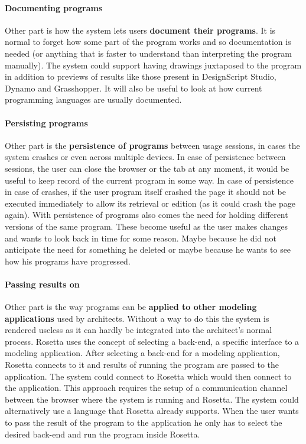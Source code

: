 \documentclass{./llncs2e/llncs}
\begin{document}
	\paragraph{Documenting programs}
	Other part is how the system lets users \textbf{document their programs}. 
	It is normal to forget how some part of the program works and so documentation is needed (or anything that is faster to understand than interpreting the program manually).
	The system could support having drawings juxtaposed to the program in addition to previews of results like those present in DesignScript Studio, Dynamo and Grasshopper. 
	It will also be useful to look at how current programming languages are usually documented. 

	\paragraph{Persisting programs}
	Other part is the \textbf{persistence of programs} between usage sessions, in cases the system crashes or even across multiple devices.
	In case of persistence between sessions, the user can close the browser or the tab at any moment, it would be useful to keep record of the current program in some way. 
	In case of persistence in case of crashes, if the user program itself crashed the page it should not be executed immediately to allow its retrieval or edition (as it could crash the page again). 
	With persistence of programs also comes the need for holding different versions of the same program. 
	These become useful as the user makes changes and wants to look back in time for some reason. 
	Maybe because he did not anticipate the need for something he deleted or maybe because he wants to see how his programs have progressed.

	\paragraph{Passing results on}
	Other part is the way programs can be \textbf{applied to other modeling applications} used by architects.
	Without a way to do this the system is rendered useless as it can hardly be integrated into the architect's normal process. 
	Rosetta uses the concept of selecting a back-end, a specific interface to a modeling application. 
	After selecting a back-end for a modeling application, Rosetta connects to it and results of running the program are passed to the application. 
	The system could connect to Rosetta which would then connect to the application. 
	This approach requires the setup of a communication channel between the browser where the system is running and Rosetta. 
	The system could alternatively use a language that Rosetta already supports. 
	When the user wants to pass the result of the program to the application he only has to select the desired back-end and run the program inside Rosetta.
\end{document}
